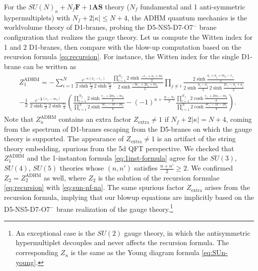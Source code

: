 \documentclass[letterpaper, 11pt]{article}
\def\e{\epsilon}
\def\k{\kappa}
\begin{document}
{For the $SU(N)_\kappa + N_f\mathbf{F} + 1\mathbf{AS}$ theory ($N_f$ fundamental and 1 anti-symmetric hypermultiplets) with $N_f + 2|\kappa| \leq N+4$, the ADHM quantum mechanics is the worldvolume theory of D1-branes, probing the D5-NS5-D7-O7${}^{-}$ brane configuration that realizes the gauge theory. Let us compute the Witten index for 1 and 2 D1-branes, then compare with the blow-up computation based on the recursion formula \eqref{eq:recursion}. For instance, the Witten index for the single D1-brane can be written as
\begin{align}
\begin{split}
  &Z_1^\text{ADHM} = - \sum_{i=1}^N \frac{e^{-\k (a_i - \e_+)}}{2\sinh{\frac{\e_1}{2}}\,2\sinh{\frac{\e_2}{2}}} \frac{\prod_{l=1}^{N_f}2\sinh{\frac{-\e_+ + a_i + m_l}{2}}}{2\sinh{\frac{-3\e_+ + 2a_i + m_a}{2}}} \prod_{j \neq i}\frac{2\sinh{\frac{a_i + a_j + m_a - \e_+}{2}}}{2\sinh{ \frac{a_{i}-a_j}{2}}\, 2\sinh{\frac{2\e_+ - a_i + a_j}{2}}}  \\
  &- \frac{1}{2}\ \frac{e^{-\frac{\k}{2}(\e_+ - m_a)}}{2\sinh{\frac{\e_1}{2}}\,2\sinh{\frac{\e_2}{2}}} \left(\frac{\prod_{l=1}^{N_f} 2\sinh{\frac{\e_+ + 2m_l - m_a}{4}}}{\prod_{i=1}^N 2\sinh{\frac{3\e_+ - M - 2a_i}{4}}} - (-1)^{\k + \frac{N-N_f}{2}}\frac{\prod_{l=1}^{N_f} 2\cosh{\frac{\e_+ + 2m_l - m_a}{4}}}{\prod_{i=1}^N 2\cosh{\frac{3\e_+ - M - 2a_i}{4}}}\right).
\end{split}
\end{align}
Note that $Z_n^\text{ADHM}$ contains an extra factor $Z_\text{extra} \neq 1$ if $N_f + 2|\k| = N+4$, coming from the spectrum of D1-branes escaping from the D5-branes on which the gauge theory is supported. 
The appearance of $Z_\text{extra}\neq 1$ is an artifact of the string theory embedding, spurious from the 5d QFT perspective.
We checked that $Z_1^\text{ADHM}$ and the 1-instanton formula \eqref{eq:1inst-formula} agree for the $SU(3)$, $SU(4)$, $SU(5)$ theories whose $(n,n')$ satisfies $\frac{n+n'}{2} \geq 2$. 
We confirmed $Z_2 = Z_2^\text{ADHM}$ as well, where $Z_2$ is the solution of the recursion formulae \eqref{eq:recursion} with \eqref{eq:sun-nf-na}. The same spurious factor $Z_\text{extra}$ arises from the recursion formula, implying that our blowup equations are implicitly based on the D5-NS5-D7-O7${}^{-}$ brane realization of the gauge theory.\footnote{An exceptional case is the $SU(2)$ gauge theory, in which the antisymmetric hypermultiplet decouples and never affects the recursion formula. The corresponding $Z_n$ is the same as the Young diagram formula \eqref{eq:SUn-young}.}

}
\end{document}
